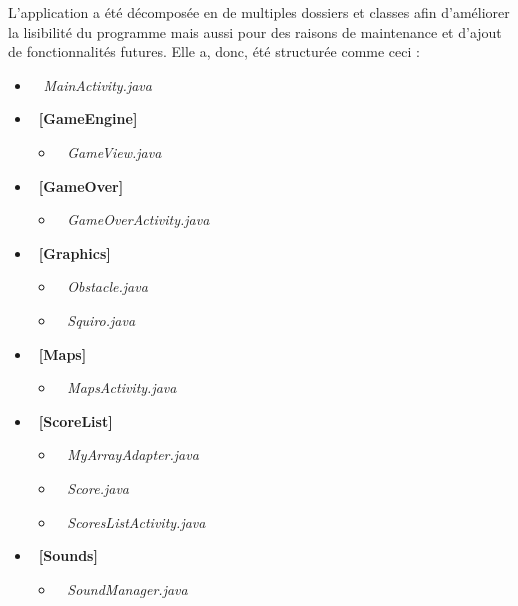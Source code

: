 \documentclass[12pt,a4paper,abstract=on,parskip=full]{scrartcl}
\begin{document}
L'application a été décomposée en de multiples dossiers et classes afin d'améliorer la lisibilité du programme mais aussi pour des raisons de maintenance et d'ajout de fonctionnalités futures.
Elle a, donc, été structurée comme ceci :

\begin{itemize}[label=$\bullet$, nosep]
\item\ \textit{\color{blue} MainActivity.java}

\item\ \textbf{[GameEngine]}
\begin{itemize}[nosep]
\item\ \textit{\color{blue} GameView.java}
\end{itemize}

\item\ \textbf{[GameOver]}
\begin{itemize}[nosep]
\item\ \textit{\color{blue} GameOverActivity.java}
\end{itemize}

\item\ \textbf{[Graphics]}
\begin{itemize}[nosep]
\item\ \textit{\color{blue} Obstacle.java}
\item\ \textit{\color{blue} Squiro.java}
\end{itemize}

\item\ \textbf{[Maps]}
\begin{itemize}[nosep]
\item\ \textit{\color{blue} MapsActivity.java}
\end{itemize}

\item\ \textbf{[ScoreList]}
\begin{itemize}[nosep]
\item\ \textit{\color{blue} MyArrayAdapter.java}
\item\ \textit{\color{blue} Score.java}
\item\ \textit{\color{blue} ScoresListActivity.java}
\end{itemize}

\item\ \textbf{[Sounds]}
\begin{itemize}[nosep]
\item\ \textit{\color{blue} SoundManager.java}
\end{itemize}

\end{itemize}
\end{document}
